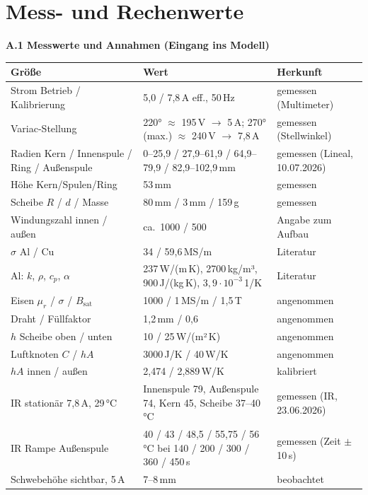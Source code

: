 \documentclass[a4paper, 10pt, conference]{ieeeconf}
\newcommand{\anh}[1]{\par\medskip\noindent\textbf{#1}\quad}
\begin{document}
\section{Mess- und Rechenwerte}
\label{app:values}

\anh{A.1 Messwerte und Annahmen (Eingang ins Modell)}

\begin{table}[!ht]
\centering\footnotesize
\begin{tabularx}{\columnwidth}{@{}>{\raggedright\arraybackslash}p{2.1cm}Y>{\raggedright\arraybackslash}p{2.0cm}@{}}
\toprule
Größe & Wert & Herkunft \\
\midrule
Strom Betrieb / Kalibrierung & 5,0 / 7,8\,A eff., 50\,Hz & gemessen (Multimeter) \\
Variac-Stellung & 220° $\approx$ 195\,V $\rightarrow$ 5\,A; 270° (max.) $\approx$ 240\,V $\rightarrow$ 7,8\,A & gemessen (Stellwinkel) \\
Radien Kern / Innenspule / Ring / Außenspule & 0--25,9 / 27,9--61,9 / 64,9--79,9 / 82,9--102,9\,mm & gemessen (Lineal, 10.07.2026) \\
Höhe Kern/Spulen/Ring & 53\,mm & gemessen \\
Scheibe $R$ / $d$ / Masse & 80\,mm / 3\,mm / 159\,g & gemessen \\
Windungszahl innen / außen & ca.\ 1000 / 500 & Angabe zum Aufbau \\
$\sigma$ Al / Cu & 34 / 59,6\,MS/m & Literatur \\
Al: $k$, $\rho$, $c_p$, $\alpha$ & 237\,W/(m\,K), 2700\,kg/m³, 900\,J/(kg\,K), $3{,}9\cdot10^{-3}$\,1/K & Literatur \\
Eisen $\mu_r$ / $\sigma$ / $B_{\mathrm{sat}}$ & 1000 / 1\,MS/m / 1,5\,T & angenommen \\
Draht / Füllfaktor & 1,2\,mm / 0,6 & angenommen \\
$h$ Scheibe oben / unten & 10 / 25\,W/(m²\,K) & angenommen \\
Luftknoten $C$ / $hA$ & 3000\,J/K / 40\,W/K & angenommen \\
$hA$ innen / außen & 2,474 / 2,889\,W/K & kalibriert \\
IR stationär 7,8\,A, 29\,°C & Innenspule 79, Außenspule 74, Kern 45, Scheibe 37--40\,°C & gemessen (IR, 23.06.2026) \\
IR Rampe Außenspule & 40 / 43 / 48,5 / 55,75 / 56\,°C bei 140 / 200 / 300 / 360 / 450\,s & gemessen (Zeit $\pm$10\,s) \\
Schwebehöhe sichtbar, 5\,A & 7--8\,mm & beobachtet \\
\bottomrule
\end{tabularx}
\end{table}
\end{document}
